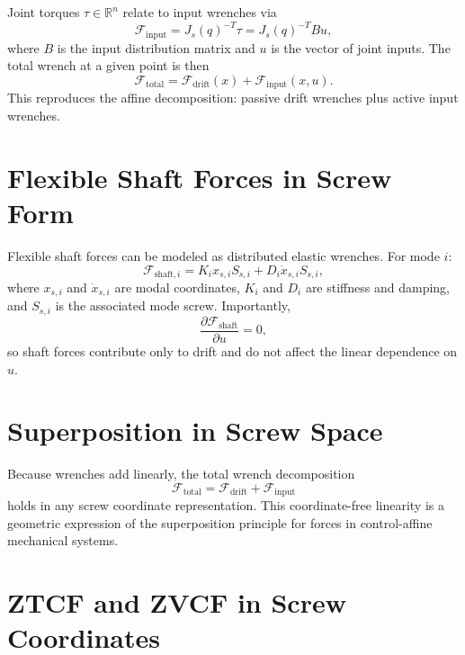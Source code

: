 \documentclass[12pt]{article}
\begin{document}
Joint torques $\tau \in \mathbb{R}^n$ relate to input wrenches via
\begin{equation}
\mathcal{F}_{\mathrm{input}}
=
J_s(q)^{-T}\tau
=
J_s(q)^{-T} B u,
\end{equation}
where $B$ is the input distribution matrix and $u$ is the vector of joint inputs. The total wrench at a given point is then
\begin{equation}
\mathcal{F}_{\mathrm{total}}
=
\mathcal{F}_{\mathrm{drift}}(x)
+
\mathcal{F}_{\mathrm{input}}(x,u).
\end{equation}
This reproduces the affine decomposition: passive drift wrenches plus active input wrenches.

\section{Flexible Shaft Forces in Screw Form}

Flexible shaft forces can be modeled as distributed elastic wrenches. For mode $i$:
\begin{equation}
\mathcal{F}_{\mathrm{shaft},i}
=
K_i x_{s,i} S_{s,i}
+
D_i \dot{x}_{s,i} S_{s,i},
\end{equation}
where $x_{s,i}$ and $\dot{x}_{s,i}$ are modal coordinates, $K_i$ and $D_i$ are stiffness and damping, and $S_{s,i}$ is the associated mode screw. Importantly,
\begin{equation}
\frac{\partial \mathcal{F}_{\mathrm{shaft}}}{\partial u} = 0,
\end{equation}
so shaft forces contribute only to drift and do not affect the linear dependence on $u$.

\section{Superposition in Screw Space}

Because wrenches add linearly, the total wrench decomposition
\begin{equation}
\mathcal{F}_{\mathrm{total}}
=
\mathcal{F}_{\mathrm{drift}}
+
\mathcal{F}_{\mathrm{input}}
\end{equation}
holds in any screw coordinate representation. This coordinate-free linearity is a geometric expression of the superposition principle for forces in control-affine mechanical systems.

\section{ZTCF and ZVCF in Screw Coordinates}
\end{document}
